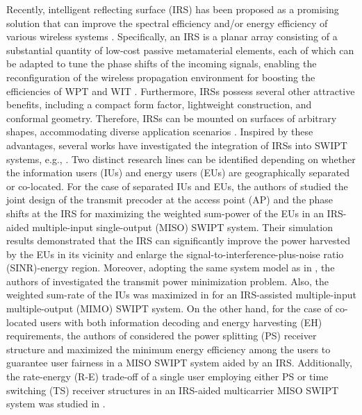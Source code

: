 \documentclass[12pt,draftclsnofoot, onecolumn]{IEEEtran}
\theoremstyle{plain}
\begin{document}
\begin{sloppypar}
Recently, intelligent reflecting surface (IRS) has been proposed as a promising solution that can improve the spectral efficiency and/or energy efficiency of various wireless systems \cite{2020_Qingqing_IRS_Intro}. Specifically, an IRS is a planar array consisting of a substantial quantity of low-cost passive metamaterial elements, each of which can be adapted to tune the phase shifts of the incoming signals, enabling the reconfiguration of the wireless propagation environment for boosting the efficiencies of WPT and WIT \cite{2019_Qingqing_Joint,2022_Qingqing_WEIT_overview,2022_Qingqing_WPCN}. Furthermore, IRSs possess several other attractive benefits, including a compact form factor, lightweight construction, and conformal geometry. Therefore, IRSs can be mounted on surfaces of arbitrary shapes, accommodating diverse application scenarios \cite{2019_Marco_intro}. Inspired by these advantages, several works have investigated the integration of IRSs into SWIPT systems, e.g., \cite{2020_Qingqing_SWIPT_letter,2020_Qingqing_SWIPT_QoS,2020_Cunhua_SWIPT,2020_Wei_SWIPT_secure,2021_Shayan_SWIPT,2022_Yang_SWIPT,2023_Ying_IFC}. Two distinct research lines can be identified depending on whether the information users (IUs) and energy users (EUs) are geographically separated or co-located. For the case of separated IUs and EUs, the authors of \cite{2020_Qingqing_SWIPT_letter} studied the joint design of the transmit precoder at the access point (AP) and the phase shifts at the IRS for maximizing the weighted sum-power of the EUs in an IRS-aided multiple-input single-output (MISO) SWIPT system. Their simulation results demonstrated that the IRS can significantly improve the power harvested by the EUs in its vicinity and enlarge the signal-to-interference-plus-noise ratio (SINR)-energy region. Moreover, adopting the same system model as in \cite{2020_Qingqing_SWIPT_letter}, the authors of \cite{2020_Qingqing_SWIPT_QoS} investigated the transmit power minimization problem. Also, the weighted sum-rate of the IUs was maximized in \cite{2020_Cunhua_SWIPT} for an IRS-assisted multiple-input multiple-output (MIMO) SWIPT system. %
On the other hand, for the case of co-located users with both information decoding and energy harvesting (EH) requirements, the authors of \cite{2021_Shayan_SWIPT} considered the power splitting (PS) receiver structure and maximized the minimum energy efficiency among the users to guarantee user fairness in a MISO SWIPT system aided by an IRS. Additionally, the rate-energy (R-E) trade-off of a single user employing either PS or time switching (TS) receiver structures in an IRS-aided multicarrier MISO SWIPT system was studied in \cite{2022_Yang_SWIPT}. %


\end{sloppypar}
\end{document}
